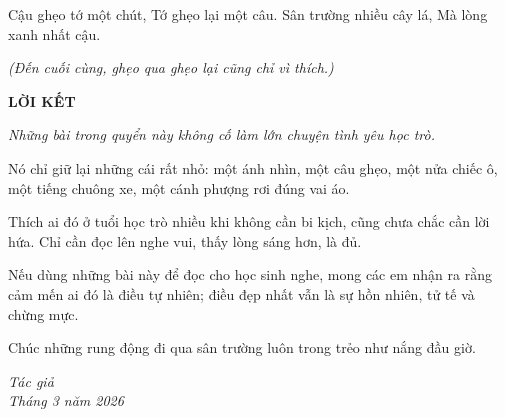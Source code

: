 \documentclass[14pt,a4paper,twoside]{extbook}
\begin{document}
Cậu ghẹo tớ một chút,
Tớ ghẹo lại một câu.
Sân trường nhiều cây lá,
Mà lòng xanh nhất cậu.

\vspace{1.5cm}\noindent
\textit{(Đến cuối cùng, ghẹo qua ghẹo lại cũng chỉ vì thích.)}

\newpage

\vspace*{4cm}

\begin{center}
\Large\bfseries\color{edublue}
LỜI KẾT
\end{center}

\vspace{2cm}

\noindent
\itshape
Những bài trong quyển này không cố làm lớn chuyện tình yêu học trò.

Nó chỉ giữ lại những cái rất nhỏ: một ánh nhìn, một câu ghẹo, một nửa chiếc ô, một tiếng chuông xe, một cánh phượng rơi đúng vai áo.

Thích ai đó ở tuổi học trò nhiều khi không cần bi kịch, cũng chưa chắc cần lời hứa. Chỉ cần đọc lên nghe vui, thấy lòng sáng hơn, là đủ.

Nếu dùng những bài này để đọc cho học sinh nghe, mong các em nhận ra rằng cảm mến ai đó là điều tự nhiên; điều đẹp nhất vẫn là sự hồn nhiên, tử tế và chừng mực.

Chúc những rung động đi qua sân trường luôn trong trẻo như nắng đầu giờ.

\vspace{3cm}

\begin{flushright}
\Large\itshape
Tác giả\\[0.3cm]
\normalsize
Tháng 3 năm 2026
\end{flushright}
\end{document}
